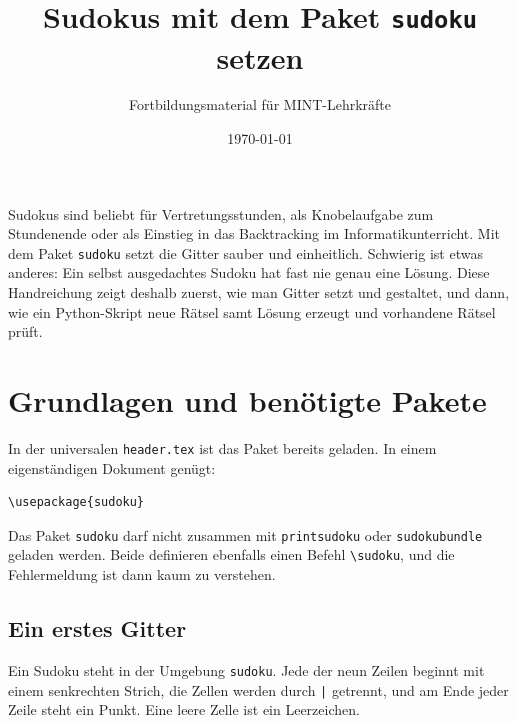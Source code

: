 



\title{Sudokus mit dem Paket \texttt{sudoku} setzen}
\author{Fortbildungsmaterial für MINT-Lehrkräfte}
\date{\today}
\pagestyle{plain}
\setlength{\parskip}{1.5em} %
\setlength{\emergencystretch}{2em} %





\maketitle

Sudokus sind beliebt für Vertretungsstunden, als Knobelaufgabe zum Stundenende oder als Einstieg in das Backtracking im Informatikunterricht. Mit dem Paket \texttt{sudoku} setzt  die Gitter sauber und einheitlich. Schwierig ist etwas anderes: Ein selbst ausgedachtes Sudoku hat fast nie genau eine Lösung. Diese Handreichung zeigt deshalb zuerst, wie man Gitter setzt und gestaltet, und dann, wie ein Python-Skript neue Rätsel samt Lösung erzeugt und vorhandene Rätsel prüft.



\section{Grundlagen und benötigte Pakete}

In der universalen \texttt{header.tex} ist das Paket bereits geladen. In einem eigenständigen Dokument genügt:

\begin{lstlisting}[style=latex]
\usepackage{sudoku}
\end{lstlisting}

Das Paket \texttt{sudoku} darf nicht zusammen mit \texttt{printsudoku} oder \texttt{sudokubundle} geladen werden. Beide definieren ebenfalls einen Befehl \texttt{\textbackslash sudoku}, und die Fehlermeldung ist dann kaum zu verstehen.


\subsection{Ein erstes Gitter}

Ein Sudoku steht in der Umgebung \texttt{sudoku}. Jede der neun Zeilen beginnt mit einem senkrechten Strich, die Zellen werden durch \texttt{|} getrennt, und am Ende jeder Zeile steht ein Punkt. Eine leere Zelle ist ein Leerzeichen.

